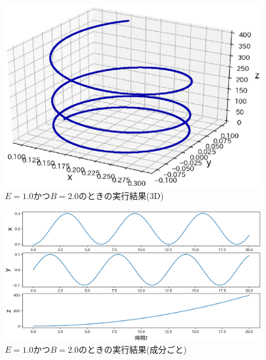 \documentclass[a4j]{jarticle}
\begin{document}
        \begin{figure}[H]
          \centering
          \includegraphics[scale=0.6]{b2e1.eps}
          \caption{$E=1.0$かつ$B=2.0$のときの実行結果(3D)}
          \label{b2e1}
          \end{figure}

        \begin{figure}[H]
          \centering
          \includegraphics[scale=0.5]{b2e1xyz.eps}
          \caption{$E=1.0$かつ$B=2.0$のときの実行結果(成分ごと)}
          \label{b2e1xyz}
          \end{figure}
\end{document}
